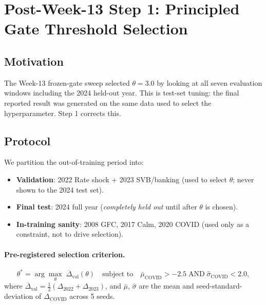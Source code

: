 
\section{Post-Week-13 Step 1: Principled Gate Threshold Selection}
\label{sec:step1}

\subsection{Motivation}

The Week-13 frozen-gate sweep selected $\theta = 3.0$ by looking at all
seven evaluation windows including the 2024 held-out year. This is
test-set tuning: the final reported result was generated on the same data
used to select the hyperparameter. Step 1 corrects this.

\subsection{Protocol}

We partition the out-of-training period into:
\begin{itemize}
  \item \textbf{Validation}: 2022 Rate shock + 2023 SVB/banking (used
        to select $\theta$; never shown to the 2024 test set).
  \item \textbf{Final test}: 2024 full year (\emph{completely held out}
        until after $\theta$ is chosen).
  \item \textbf{In-training sanity}: 2008 GFC, 2017 Calm, 2020 COVID
        (used only as a constraint, not to drive selection).
\end{itemize}

\paragraph{Pre-registered selection criterion.}
\[
\theta^* = \arg\max_\theta \;\overline{\Delta}_{\text{val}}(\theta)
\quad\text{subject to}\quad
\bar{\mu}_\text{COVID} > -2.5
\;\text{AND}\;
\hat{\sigma}_\text{COVID} < 2.0,
\]
where $\overline{\Delta}_\text{val} = \tfrac{1}{2}(\Delta_{2022} +
\Delta_{2023})$, and $\bar{\mu}$, $\hat{\sigma}$ are the mean and
seed-standard-deviation of $\Delta_\text{COVID}$ across 5 seeds.

